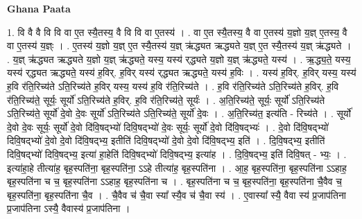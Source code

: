 \documentclass[17pt]{extarticle}
\begin{document}
\textbf{Ghana Paata } \newline

1. वि वै वै वि वि वा ए॒त स्यै॒तस्य॒ वै वि वि वा ए॒तस्य॑ । . वा ए॒त स्यै॒तस्य॒ वै वा ए॒तस्य॑ य॒ज्ञो य॒ज्ञ् ए॒तस्य॒ वै वा ए॒तस्य॑ य॒ज्ञ्ः । . ए॒तस्य॑ य॒ज्ञो य॒ज्ञ् ए॒त स्यै॒तस्य॑ य॒ज्ञ् ऋ॑द्ध्यत ऋद्ध्यते य॒ज्ञ् ए॒त स्यै॒तस्य॑ य॒ज्ञ् ऋ॑द्ध्यते । . य॒ज्ञ् ऋ॑द्ध्यत ऋद्ध्यते य॒ज्ञो य॒ज्ञ् ऋ॑द्ध्यते॒ यस्य॒ यस्य॑ र्‌द्ध्यते य॒ज्ञो य॒ज्ञ् ऋ॑द्ध्यते॒ यस्य॑ । . ऋ॒द्ध्य॒ते॒ यस्य॒ यस्य॑ र्‌द्ध्यत ऋद्ध्यते॒ यस्य॑ ह॒विर्. ह॒विर् यस्य॑ र्‌द्ध्यत ऋद्ध्यते॒ यस्य॑ ह॒विः । . यस्य॑ ह॒विर्. ह॒विर् यस्य॒ यस्य॑ ह॒वि र॑ति॒रिच्य॑ते ऽति॒रिच्य॑ते ह॒विर् यस्य॒ यस्य॑ ह॒वि र॑ति॒रिच्य॑ते । . ह॒वि र॑ति॒रिच्य॑ते ऽति॒रिच्य॑ते ह॒विर्. ह॒वि र॑ति॒रिच्य॑ते॒ सूर्यः॒ सूर्यो॑ ऽति॒रिच्य॑ते ह॒विर्. ह॒वि र॑ति॒रिच्य॑ते॒ सूर्यः॑ । . अ॒ति॒रिच्य॑ते॒ सूर्यः॒ सूर्यो॑ ऽति॒रिच्य॑ते ऽति॒रिच्य॑ते॒ सूर्यो॑ दे॒वो दे॒वः सूर्यो॑ ऽति॒रिच्य॑ते ऽति॒रिच्य॑ते॒ सूर्यो॑ दे॒वः । . अ॒ति॒रिच्य॑त॒ इत्य॑ति - रिच्य॑ते । . सूर्यो॑ दे॒वो दे॒वः सूर्यः॒ सूर्यो॑ दे॒वो दि॑वि॒षद्भ्यो॑ दिवि॒षद्भ्यो॑ दे॒वः सूर्यः॒ सूर्यो॑ दे॒वो दि॑वि॒षद्भ्यः॑ । . दे॒वो दि॑वि॒षद्भ्यो॑ दिवि॒षद्भ्यो॑ दे॒वो दे॒वो दि॑वि॒षद्भ्य॒ इतीति॑ दिवि॒षद्भ्यो॑ दे॒वो दे॒वो दि॑वि॒षद्भ्य॒ इति॑ । . दि॒वि॒षद्भ्य॒ इतीति॑ दिवि॒षद्भ्यो॑ दिवि॒षद्भ्य॒ इत्या॑ हा॒हेति॑ दिवि॒षद्भ्यो॑ दिवि॒षद्भ्य॒ इत्या॑ह । . दि॒वि॒षद्भ्य॒ इति॑ दिवि॒षत् - भ्यः॒ । . इत्या॑हा॒हे तीत्या॑ह॒ बृह॒स्पति॑ना॒ बृह॒स्पति॑ना॒ ऽऽहे तीत्या॑ह॒ बृह॒स्पति॑ना । . आ॒ह॒ बृह॒स्पति॑ना॒ बृह॒स्पति॑ना ऽऽहाह॒ बृह॒स्पति॑ना च च॒ बृह॒स्पति॑ना ऽऽहाह॒ बृह॒स्पति॑ना च । . बृह॒स्पति॑ना च च॒ बृह॒स्पति॑ना॒ बृह॒स्पति॑ना चै॒वैव च॒ बृह॒स्पति॑ना॒ बृह॒स्पति॑ना चै॒व । . चै॒वैव च॑ चै॒वा स्या᳚ स्यै॒व च॑ चै॒वा स्य॑ । . ए॒वास्या᳚ स्यै॒ वैवा स्य॑ प्र॒जाप॑तिना प्र॒जाप॑तिना ऽस्यै॒ वैवास्य॑ प्र॒जाप॑तिना । \newline
\end{document}
